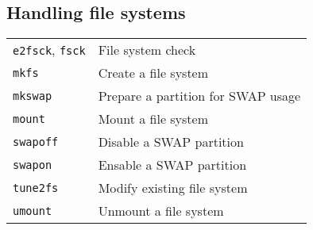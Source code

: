\documentclass[10pt]{article}
\begin{document}
\newpage

\cheatsheet

\begin{multicols}{2} 
\section{Handling file systems}
\begin{tabular}{ p{2.5cm} p{8.5cm} }
  \hline
  \texttt{e2fsck}, \texttt{fsck} & File system check \\
  \rowcolor{Gray}
  \texttt{mkfs} & Create a file system \\
  \texttt{mkswap} & Prepare a partition for SWAP usage \\
  \rowcolor{Gray}
  \texttt{mount} & Mount a file system \\
  \texttt{swapoff} & Disable a SWAP partition \\
  \rowcolor{Gray}
  \texttt{swapon} & Ensable a SWAP partition \\
  \texttt{tune2fs} & Modify existing file system \\
  \rowcolor{Gray}
  \texttt{umount} & Unmount a file system\\
  \hline
\end{tabular}



\end{multicols}
\end{document}

